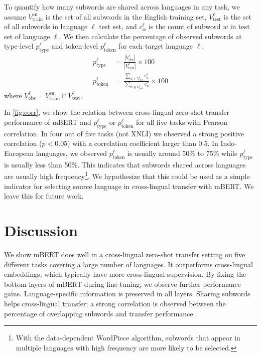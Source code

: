 \documentclass[11pt,a4paper]{article}
\newcommand{\ptype}{p_\text{type}}
\newcommand{\ptoken}{p_\text{token}}
\begin{document}
To quantify how many subwords are shared across languages in any task, we assume $V^\text{en}_{\text{train}}$ is the set of all subwords in the English training set, $V^\ell_{\text{test}}$ is the set of all subwords in language $\ell$ test set, and $c^\ell_w$ is the count of subword $w$ in test set of language $\ell$. We then calculate the percentage of observed subwords at type-level $\ptype^\ell$ and token-level $\ptoken^\ell$ for each target language $\ell$.
\begin{align*}
\ptype^\ell &= \frac{|V^\ell_\text{obs}|}{|V^{\ell}_\text{test}|} \times 100 \\
\ptoken^\ell &= \frac{ \sum_{w\in V^\ell_\text{obs}} c^\ell_w } { \sum_{w\in V^\ell_\text{test}} c^\ell_w } \times 100
\end{align*}
where $V^\ell_\text{obs} = V^\text{en}_{\text{train}} \cap V^\ell_{\text{test}}$.

In \cref{fig:corr}, we show the relation between cross-lingual zero-shot transfer performance of mBERT and $\ptype^\ell$ or $\ptoken^\ell$ for all five tasks with Pearson correlation. In four out of five tasks (not XNLI) we observed a strong positive correlation  ($p<0.05$) with a correlation coefficient larger than 0.5. In Indo-European languages, we observed $\ptoken^\ell$ is usually around 50\% to 75\% while $\ptype^\ell$ is usually less than 50\%. This indicates that subwords shared across languages are usually high frequency\footnote{With the data-dependent WordPiece algorithm, subwords that appear in multiple languages with high frequency are more likely to be selected.}. We hypothesize that this could be used as a simple indicator for selecting source language in cross-lingual transfer with mBERT. We leave this for future work.

\section{Discussion}
We show mBERT does well in a cross-lingual zero-shot transfer setting on five different tasks covering a large number of languages. 
It outperforms cross-lingual embeddings, which typically have more cross-lingual supervision. By fixing the bottom layers of mBERT during fine-tuning, we observe further performance gains. Language-specific information is preserved in all layers. Sharing subwords helps cross-lingual transfer; a strong correlation is observed between the percentage of overlapping subwords and transfer performance.
\end{document}
